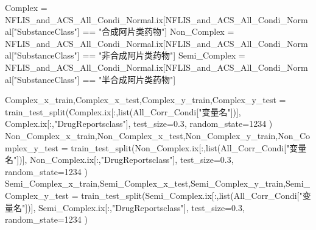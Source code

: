 \documentclass[
]{article}
\newenvironment{Shaded}{}{}
\newcommand{\BuiltInTok}[1]{#1}
\newcommand{\DecValTok}[1]{\textcolor[rgb]{0.25,0.63,0.44}{#1}}
\newcommand{\FloatTok}[1]{\textcolor[rgb]{0.25,0.63,0.44}{#1}}
\newcommand{\NormalTok}[1]{#1}
\newcommand{\OperatorTok}[1]{\textcolor[rgb]{0.40,0.40,0.40}{#1}}
\newcommand{\StringTok}[1]{\textcolor[rgb]{0.25,0.44,0.63}{#1}}
\begin{document}
\begin{Shaded}
\begin{Highlighting}[]
\NormalTok{Complex }\OperatorTok{=}\NormalTok{ NFLIS\_and\_ACS\_All\_Condi\_Normal.ix[NFLIS\_and\_ACS\_All\_Condi\_Normal[}\StringTok{"SubstanceClass"}\NormalTok{] }\OperatorTok{==} \StringTok{"合成阿片类药物"}\NormalTok{]}
\NormalTok{Non\_Complex }\OperatorTok{=}\NormalTok{ NFLIS\_and\_ACS\_All\_Condi\_Normal.ix[NFLIS\_and\_ACS\_All\_Condi\_Normal[}\StringTok{"SubstanceClass"}\NormalTok{] }\OperatorTok{==} \StringTok{"非合成阿片类药物"}\NormalTok{]}
\NormalTok{Semi\_Complex }\OperatorTok{=}\NormalTok{ NFLIS\_and\_ACS\_All\_Condi\_Normal.ix[NFLIS\_and\_ACS\_All\_Condi\_Normal[}\StringTok{"SubstanceClass"}\NormalTok{] }\OperatorTok{==} \StringTok{"半合成阿片类药物"}\NormalTok{]}

\NormalTok{Complex\_x\_train,Complex\_x\_test,Complex\_y\_train,Complex\_y\_test }\OperatorTok{=}\NormalTok{ train\_test\_split(Complex.ix[:,}\BuiltInTok{list}\NormalTok{(All\_Corr\_Condi[}\StringTok{"变量名"}\NormalTok{])],}
\NormalTok{                                                                                 Complex.ix[:,}\StringTok{"DrugReportsclass"}\NormalTok{],}
\NormalTok{                                                                                 test\_size}\OperatorTok{=}\FloatTok{0.3}\NormalTok{,}
\NormalTok{                                                                                 random\_state}\OperatorTok{=}\DecValTok{1234}\NormalTok{ )}
\NormalTok{Non\_Complex\_x\_train,Non\_Complex\_x\_test,Non\_Complex\_y\_train,Non\_Complex\_y\_test }\OperatorTok{=}\NormalTok{ train\_test\_split(Non\_Complex.ix[:,}\BuiltInTok{list}\NormalTok{(All\_Corr\_Condi[}\StringTok{"变量名"}\NormalTok{])],}
\NormalTok{                                                                                                 Non\_Complex.ix[:,}\StringTok{"DrugReportsclass"}\NormalTok{],}
\NormalTok{                                                                                                 test\_size}\OperatorTok{=}\FloatTok{0.3}\NormalTok{,}
\NormalTok{                                                                                                 random\_state}\OperatorTok{=}\DecValTok{1234}\NormalTok{ )}
\NormalTok{Semi\_Complex\_x\_train,Semi\_Complex\_x\_test,Semi\_Complex\_y\_train,Semi\_Complex\_y\_test }\OperatorTok{=}\NormalTok{ train\_test\_split(Semi\_Complex.ix[:,}\BuiltInTok{list}\NormalTok{(All\_Corr\_Condi[}\StringTok{"变量名"}\NormalTok{])],}
\NormalTok{                                                                                                     Semi\_Complex.ix[:,}\StringTok{"DrugReportsclass"}\NormalTok{],}
\NormalTok{                                                                                                     test\_size}\OperatorTok{=}\FloatTok{0.3}\NormalTok{,}
\NormalTok{                                                                                                     random\_state}\OperatorTok{=}\DecValTok{1234}\NormalTok{ )}
\end{Highlighting}
\end{Shaded}
\end{document}
